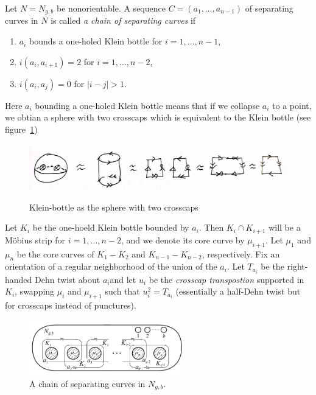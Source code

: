 \documentclass[reqno]{amsart}
\theoremstyle{definition}
\theoremstyle{remark}
\begin{document}
Let $N = N_{g,b}$ be nonorientable. A sequence
$C = \left( a_1, \ldots, a_{n-1} \right) $ of separating
curves in $N$ is called \textit{a chain of separating curves} if
\begin{enumerate}
    \item $a_i$ bounds a one-holed Klein bottle
        for $i = 1, \ldots, n-1$,
    \item $i \left( a_i, a_{i+1} \right) = 2$ for
        $i = 1,\ldots, n-2$,
    \item $i\left( a_i, a_j \right) = 0$ for
        $\left| i-j \right| > 1$.
\end{enumerate}


Here $a_i$ bounding a one-holed Klein bottle means
that if we collapse $a_i$ to a point, we obtian a 
sphere with two crosscaps which is equivalent to the Klein bottle
(see figure~\ref{fig:klein-bottle})

\begin{figure}[H]
    \centering
    \includegraphics[width=1.2\textwidth]{klein-bottle.jpg}
    \label{fig:klein-bottle}
    \caption{Klein-bottle as the sphere with two crosscaps}
\end{figure}

Let $K_i$ be the one-hoeld Klein bottle bounded by
$a_i$. Then $K_i \cap K_{i+1}$ will be a Möbius strip
for $i = 1, \ldots, n-2$, and we denote its core curve
by $\mu_{i+1}$. Let $\mu_1$ and $\mu_n$ be the core curves
of $K_1 - K_2$ and $K_{n-1} - K_{n-2}$, respectively.
Fix an orientation of a regular neighborhood of
the union of the $a_i$. Let $T_{a_i}$ be the right-handed
Dehn twist about $a_i$and let $u_i$ be the 
\textit{crosscap transpostion} supported
in $K_i$, swapping $\mu_i$ and $\mu_{i+1}$ such that
$u_i^2 = T_{a_i}$ (essentially a half-Dehn twist but for crosscaps
instead of punctures).

\begin{figure}[H]
    \centering
    \includegraphics[width=0.6\textwidth]{chain-separating-curves.png}
    \caption{A chain of separating curves in
    $N_{g,b}$.}
    \label{fig:chain-separating-curves-png}
\end{figure}
\end{document}
